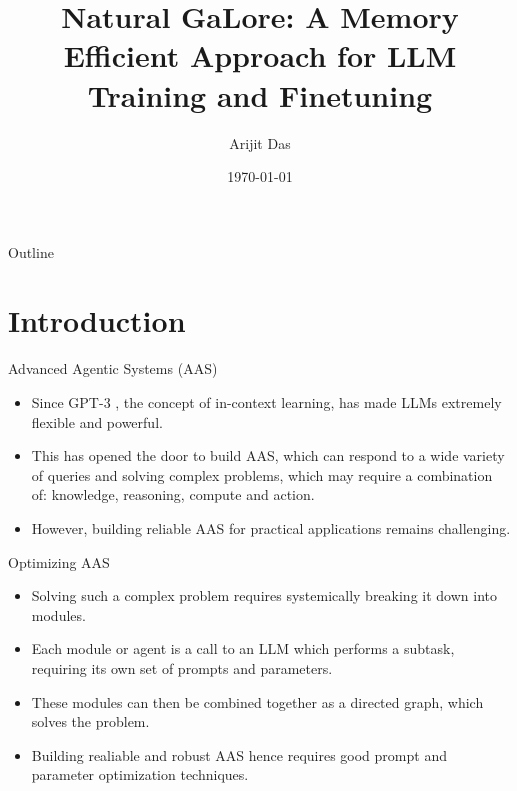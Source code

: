 \documentclass{beamer}
\title{Natural GaLore: A Memory Efficient Approach for LLM Training and Finetuning}
\author{Arijit Das}
\date{\today}
\begin{document}
\begin{frame}
    \titlepage
\end{frame}

\begin{frame}{Outline}
    \tableofcontents
\end{frame}

\section{Introduction}

\begin{frame}{Advanced Agentic Systems (AAS)}
    \begin{itemize}
        \item Since GPT-3 \citep{brownLanguageModelsAre2020}, the concept of in-context learning, has made LLMs extremely flexible and powerful.
        \item This has opened the door to build AAS, which can respond to a wide variety of queries and solving complex problems, which may require a combination of: knowledge, reasoning, compute and action.
        \item However, building reliable AAS for practical applications remains challenging.
    \end{itemize}
\end{frame}

\begin{frame}{Optimizing AAS}
    \begin{itemize}
        \item Solving such a complex problem requires systemically breaking it down into modules.
        \item Each module or agent is a call to an LLM which performs a subtask, requiring its own set of prompts and parameters.
        \item These modules can then be combined together as a directed graph, which solves the problem.
        \item Building realiable and robust AAS hence requires good prompt and parameter optimization techniques.
    \end{itemize}
\end{frame}
\end{document}
